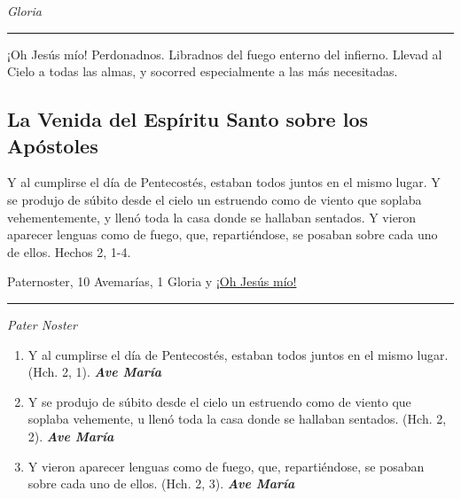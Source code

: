 \documentclass[a4paper,11pt, oneside]{report}
\begin{document}
{{\begin{enumerate}
      \end{enumerate}

      \indent\textit{Gloria} \par      

      \begin{center}\rule{1\linewidth}{\linethickness}\end{center}      

      \medskip
      \hypertarget{finalAscension}{¡Oh Jesús mío! Perdonadnos. Libradnos del fuego enterno del infierno. Llevad al Cielo a todas las almas, y socorred especialmente a las más 
      necesitadas.}
    }
    
  \subsection*{La Venida del Espíritu Santo sobre los Apóstoles}
    {
      Y al cumplirse el día de Pentecostés, estaban todos juntos en el mismo lugar. Y se produjo de súbito desde el cielo un estruendo como de viento
      que soplaba vehementemente, y llenó toda la casa donde se hallaban sentados. Y vieron aparecer lenguas como de fuego, que, repartiéndose, se 
      posaban sobre cada uno de ellos. Hechos 2, 1-4.

       Paternoster, 10 Avemarías, 1 Gloria y \hyperlink{finalPentecostes}{¡Oh Jesús mío!}

      \begin{center}\rule{1\linewidth}{\linethickness}\end{center}

      \medskip
      \textit{Pater Noster}

      \begin{enumerate}

        \item Y al cumplirse el día de Pentecostés, estaban todos juntos en el mismo lugar. (Hch. 2, 1). \textbf{\textit{Ave María}}

        \item Y se produjo de súbito desde el cielo un estruendo como de viento que soplaba vehemente, u llenó toda la casa
        donde se hallaban sentados. (Hch. 2, 2). \textbf{\textit{Ave María}}

        \item Y vieron aparecer lenguas como de fuego, que, repartiéndose, se posaban sobre cada uno de ellos. (Hch. 2, 3). \textbf{\textit{Ave María}}


\end{enumerate}}}
\end{document}
